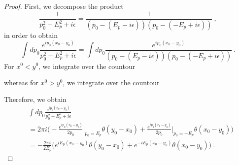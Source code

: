 \documentclass[a4paper]{article}
\begin{document}
    \begin{proof}
        First, we decompose the product
        \begin{equation*}
            \frac{1}{p_0^2 - E_p^2 + i \epsilon} = \frac{1}{(p_0 - (E_p - i \epsilon))(p_0 - (-E_p + i \epsilon))} ~,
        \end{equation*}
        in order to obtain 
        \begin{equation*}
            \int d p_0 \frac{e^{i p_0 (x_0 - y_0)}}{p_0^2 - E_p^2 + i \epsilon} = \int d p_0 \frac{e^{i p_0 (x_0 - y_0)}}{(p_0 - (E_p - i \epsilon))(p_0 - (-E_p + i \epsilon))} ~.
        \end{equation*}
        For $x^0 < y^0$, we integrate over the countour
        \begin{figure}[ht!]
            \centering
        \end{figure}
        \newline whereas for $x^0 > y^0$, we integrate over the countour
        \begin{figure}[ht!]
            \centering
        \end{figure}
        \newline Therefore, we obtain
        \begin{align*}
            & \int d p_0 \frac{e^{i p_0 (x_0 - y_0)}}{p_0^2 - E_p^2 + i \epsilon} \\ & = 2 \pi i \Big ( - \frac{e^{i p_0 (x_0 - y_0)}}{2 p_0} \Big \vert_{p_0 = E_p} \theta (y_0 - x_0) + \frac{e^{i p_0 (x_0 - y_0)}}{2 p_0} \Big \vert_{p_0 = - E_p} \theta (x_0 - y_0)\Big) \\ & = - \frac{2 \pi i}{2 E_p} \Big ( e^{i E_p (x_0 - y_0)} \theta(y_0 - x_0) + e^{- i E_p (x_0 - y_0)} \theta(x_0 - y_0) \Big ) ~.
        \end{align*}

    \end{proof}
    
\nocite{qftlecture} 
\nocite{schwartz}  
\printbibliography 

\immediate{}
\end{document}
